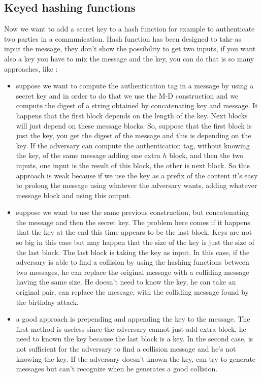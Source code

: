 \documentclass[11pt]{article}
\begin{document}
\subsection{Keyed hashing functions}
Now we want to add a secret key to a hash function for example to authenticate two parties in a communication. Hash function has been designed to take as input the message, they don't show the possibility to get two inputs, if you want also a key you have to mix the message and the key, you can do that is so many approaches, like :
\begin{itemize}
\item suppose we want to compute the authentication tag in a message by using a secret key and in order to do that we use the M-D construction and we compute the digest of a string obtained by concatenating key and message. It happens that the first block depends on the length of the key. Next blocks will just depend on these message blocks. So, suppose that the first block is just the key, you get the digest of the message and this is depending on the key. If the adversary can compute the authentication tag, without knowing the key, of the same message adding one extra $h$ block, and then the two inputs, one input is the result of this block, the other is next block. So this approach is weak because if we use the key as a prefix of the content it's easy to prolong the message using whatever the adversary wants, adding whatever message block and using this output. 
\item suppose we want to use the same previous construction, but concatenating the message and then the secret key. The problem here comes if it happens that the key at the end this time appears to be the last block. Keys are not so big in this case but may happen that the size of the key is just the size of the last block. The last block is taking the key as input. In this case, if the adversary is able to find a collision by using the hashing functions between two messages, he can replace the original message with a colliding message having the same size. He doesn't need to know the key, he can take an original pair, can replace the message, with the colliding message found by the birthday attack.
\item a good approach is prepending and appending the key to the message. The first method is useless since the adversary cannot just add extra block, he need to known the key because the last block is a key. In the second case, is not sufficient for the adversary to find a collision message and he's not knowing the key. If the adversary doesn't known the key, can try to generate messages but can't recognize when he generates a good collision. 
\end{itemize}
\end{document}
